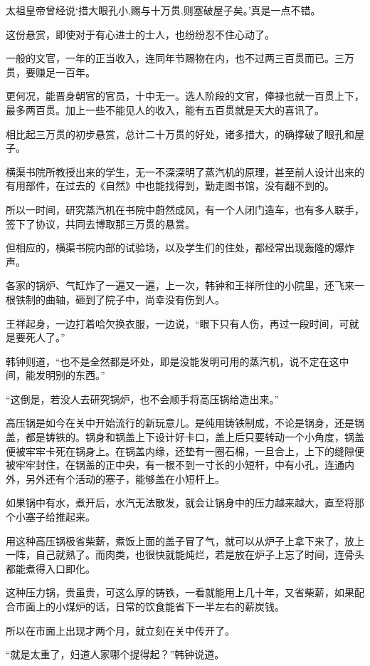 太祖皇帝曾经说‘措大眼孔小,赐与十万贯,则塞破屋子矣。’真是一点不错。

这份悬赏，即使对于有心进士的士人，也纷纷忍不住心动了。

一般的文官，一年的正当收入，连同年节赐物在内，也不过两三百贯而已。三万贯，要赚足一百年。

更何况，能晋身朝官的官员，十中无一。选人阶段的文官，俸禄也就一百贯上下，最多两百贯。加上一些不能见人的收入，能有五百贯就是天大的喜讯了。

相比起三万贯的初步悬赏，总计二十万贯的好处，诸多措大，的确撑破了眼孔和屋子。

横渠书院所教授出来的学生，无一不深深明了蒸汽机的原理，甚至前人设计出来的有用部件，在过去的《自然》中也能找得到，勤走图书馆，没有翻不到的。

所以一时间，研究蒸汽机在书院中蔚然成风，有一个人闭门造车，也有多人联手，签下了协议，共同去博取那三万贯的悬赏。

但相应的，横渠书院内部的试验场，以及学生们的住处，都经常出现轰隆的爆炸声。

各家的锅炉、气缸炸了一遍又一遍，上一次，韩钟和王祥所住的小院里，还飞来一根铁制的曲轴，砸到了院子中，尚幸没有伤到人。

王祥起身，一边打着哈欠换衣服，一边说，“眼下只有人伤，再过一段时间，可就是要死人了。”

韩钟则道，“也不是全然都是坏处，即是没能发明可用的蒸汽机，说不定在这中间，能发明别的东西。”

“这倒是，若没人去研究锅炉，也不会顺手将高压锅给造出来。”

高压锅是如今在关中开始流行的新玩意儿。是纯用铸铁制成，不论是锅身，还是锅盖，都是铸铁的。锅身和锅盖上下设计好卡口，盖上后只要转动一个小角度，锅盖便被牢牢卡死在锅身上。在锅盖内缘，还垫有一圈石棉，一旦合上，上下的缝隙便被牢牢封住，在锅盖的正中央，有一根不到一寸长的小短杆，中有小孔，连通内外，另外还有个活动的塞子，能够盖在小短杆上。

如果锅中有水，煮开后，水汽无法散发，就会让锅身中的压力越来越大，直至将那个小塞子给推起来。

用这种高压锅极省柴薪，煮饭上面的盖子冒了气，就可以从炉子上拿下来了，放上一阵，自己就熟了。而肉类，也很快就能炖烂，若是放在炉子上忘了时间，连骨头都能煮得入口即化。

这种压力锅，贵虽贵，可这么厚的铸铁，一看就能用上几十年，又省柴薪，如果配合市面上的小煤炉的话，日常的饮食能省下一半左右的薪炭钱。

所以在市面上出现才两个月，就立刻在关中传开了。

“就是太重了，妇道人家哪个提得起？”韩钟说道。

